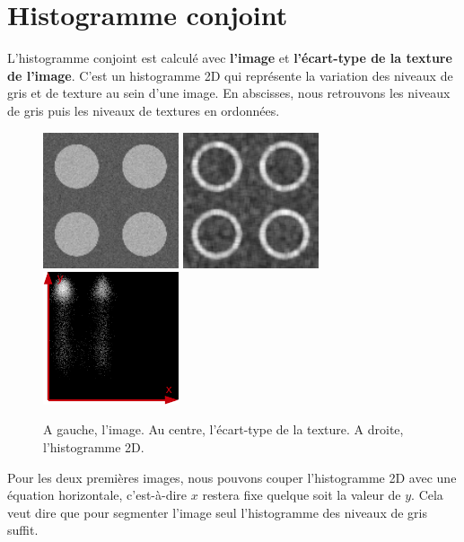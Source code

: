 \documentclass[11pt]{article}
\begin{document}
  \section{Histogramme conjoint}
  
  L'histogramme conjoint est calculé avec \textbf{l'image} et \textbf{l'écart-type de la texture de 
  l'image}. C'est un histogramme 2D qui représente la variation des niveaux de gris et de texture au 
  sein d'une image. En abscisses, nous retrouvons les niveaux de gris puis les niveaux de textures en
  ordonnées.\\
  
  \begin{figure}[H]
    \center
    \includegraphics[width=4cm]{texture-0/texture-0.png}
    \includegraphics[width=4cm]{texture-0/texture-0-5-ecart-type.png}
    \includegraphics[width=4cm]{hist2D.png}
    \caption{\small{A gauche, l'image. Au centre, l'écart-type de la texture. A droite, l'histogramme 2D.}}
  \end{figure}
  
  \newpage
  
  Pour les deux premières images, nous pouvons couper l'histogramme 2D avec une équation horizontale,
  c'est-à-dire $x$ restera fixe quelque soit la valeur de $y$. Cela veut dire que pour segmenter l'image 
  seul l'histogramme des niveaux de gris suffit.
  
\end{document}
